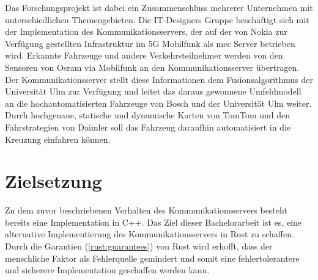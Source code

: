 Das Forschungsprojekt ist dabei ein Zusammenschluss mehrerer Unternehmen mit unterschiedlichen Themengebieten.
Die IT-Designers Gruppe beschäftigt sich mit der Implementation des Kommunikationsservers, der auf der von Nokia zur Verfügung gestellten Infrastruktur im 5G Mobilfunk als \gls{mec} Server betrieben wird.
Erkannte Fahrzeuge und andere Verkehrsteilnehmer werden von den Sensoren von Osram via Mobilfunk an den Kommunikationsserver übertragen.
Der Kommunikationsserver stellt diese Informationen dem Fusionsalgorithmus der Universität Ulm zur Verfügung und leitet das daraus gewonnene Umfeldmodell an die hochautomatisierten Fahrzeuge von Bosch und der Universität Ulm weiter.
Durch hochgenaue, statische und dynamische Karten von TomTom und den Fahrstrategien von Daimler soll das Fahrzeug daraufhin automatisiert in die Kreuzung einfahren können.



\section{Zielsetzung}

Zu dem zuvor beschriebenen Verhalten des Kommunikationsservers besteht bereits eine Implementation in C++.
Das Ziel dieser Bachelorarbeit ist es, eine alternative Implementierung des Kommunikationsservers in Rust zu schaffen.
Durch die Garantien (\autoref{rust:guarantees}) von Rust wird erhofft, dass der menschliche Faktor als Fehlerquelle gemindert und somit eine fehlertolerantere und sicherere Implementation geschaffen werden kann.

